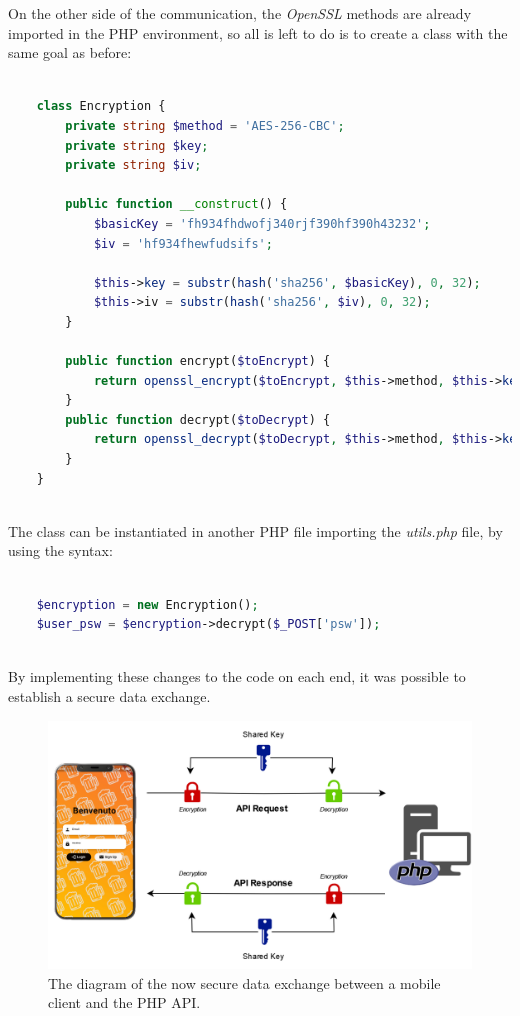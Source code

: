 \documentclass[target=bach,aauheader=,style=]{thud}
\begin{document}
On the other side of the communication, the \emph{OpenSSL} methods are already imported in the PHP environment, so all is left to do is to create a class with the same goal as before:

\begin{lstlisting}[language=php,style=php]
	
	class Encryption {
		private string $method = 'AES-256-CBC';
		private string $key;
		private string $iv;
		
		public function __construct() {
			$basicKey = 'fh934fhdwofj340rjf390hf390h43232';
			$iv = 'hf934fhewfudsifs';
			
			$this->key = substr(hash('sha256', $basicKey), 0, 32);
			$this->iv = substr(hash('sha256', $iv), 0, 32);
		}
		
		public function encrypt($toEncrypt) {
			return openssl_encrypt($toEncrypt, $this->method, $this->key, 0, $this->iv);
		}
		public function decrypt($toDecrypt) {
			return openssl_decrypt($toDecrypt, $this->method, $this->key, 0, $this->iv);
		}
	}
	
\end{lstlisting}

The class can be instantiated in another PHP file  importing the \emph{utils.php} file, by using the syntax:

\begin{lstlisting}[language=php,style=php]

	$encryption = new Encryption();
	$user_psw = $encryption->decrypt($_POST['psw']);
	 
\end{lstlisting}

By implementing these changes to the code on each end, it was possible to establish a secure data exchange.

\begin{figure}[h]
	\centering
	\includegraphics[scale=0.3]{phpapi}
	\caption{The diagram of the now secure data exchange between a mobile client and the PHP API.}
	\label{fig:phpapi}
\end{figure}
\end{document}
